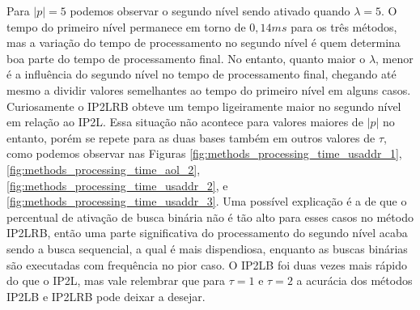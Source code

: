 Para $|p|=5$ podemos observar o segundo nível sendo ativado quando $\lambda=5$. O tempo do primeiro nível permanece em torno de $0,14ms$ para os três métodos, mas a variação do tempo de processamento no segundo nível é quem determina boa parte do tempo de processamento final. No entanto, quanto maior o $\lambda$, menor é a influência do segundo nível no tempo de processamento final, chegando até mesmo a dividir valores semelhantes ao tempo do primeiro nível em alguns casos. Curiosamente o IP2LRB obteve um tempo ligeiramente maior no segundo nível em relação ao IP2L. Essa situação não acontece para valores maiores de $|p|$ no entanto, porém se repete para as duas bases também em outros valores de $\tau$, como podemos observar nas Figuras \ref{fig:methods_processing_time_usaddr_1}, \ref{fig:methods_processing_time_aol_2}, \ref{fig:methods_processing_time_usaddr_2}, e \ref{fig:methods_processing_time_usaddr_3}. Uma possível explicação é a de que o percentual de ativação de busca binária não é tão alto para esses casos no método IP2LRB, então uma parte significativa do processamento do segundo nível acaba sendo a busca sequencial, a qual é mais dispendiosa, enquanto as buscas binárias são executadas com frequência no pior caso. O IP2LB foi duas vezes mais rápido do que o IP2L, mas vale relembrar que para $\tau=1$ e $\tau=2$ a acurácia dos métodos IP2LB e IP2LRB pode deixar a desejar.


